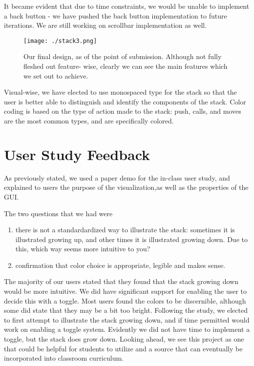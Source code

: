 \documentclass[12pt]{article}
\begin{document}
It became evident that due to time constraints, we would be unable to implement a back button
- we have pushed the back button implementation to future iterations. We are still working on
scrollbar implementation as well. 

\begin{figure}[h!]
  \centering
  \texttt{[image: ./stack3.png]}
  \caption{Our final design, as of the point of submission. Although not fully fleshed out feature-
           wise, clearly we can see the main features which we set out to achieve.}
\end{figure}

Visual-wise, we have elected to use monospaced type for the stack so that the user is better
able to distinguish and identify the components of the stack. Color coding is based on the type
of action made to the stack: push, calls, and moves are the most common types, and are
specifically colored.

\section{User Study Feedback}
As previously stated, we used a paper demo for the in-class user study, and explained to users
the purpose of the visualization,as well as the properties of the GUI.

The two questions that we had were
\begin{enumerate}
  \item there is not a standardardized way to illustrate the stack: sometimes it is illustrated
    growing up, and other times it is illustrated growing down. Due to this, which way seems more
    intuitive to you?
  \item confirmation that color choice is appropriate, legible and makes sense.
\end{enumerate}

The majority of our users stated that they found that the stack growing down would be more intuitive.
We did have significant support for enabling the user to decide this with a toggle. Most users found the
colors to be discernible, although some did state that they may be a bit too bright. Following the
study, we elected to first attempt to illustrate the stack growing down, and if time permitted would
work on enabling a toggle system. Evidently we did not have time to implement a toggle, but the
stack does grow down.  Looking ahead, we see this project as one that could be helpful for students
to utilize and a source that can eventually be incorporated into classroom curriculum.
\end{document}
